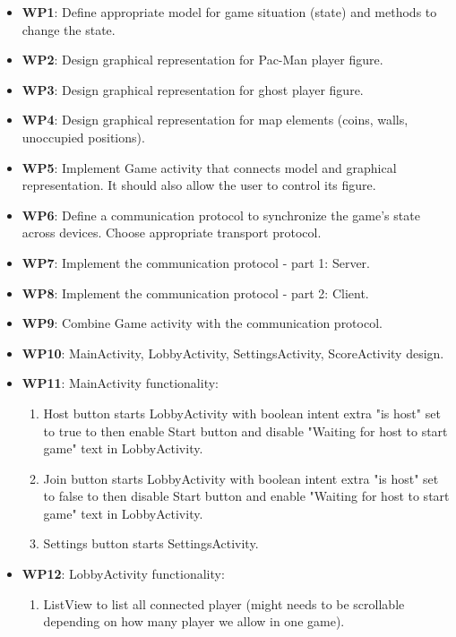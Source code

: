 \documentclass{report}
\begin{document}

\begin{itemize}
	\item {\bf WP1}: Define appropriate model for game situation (state) and methods to change the state.        
	\item {\bf WP2}: Design graphical representation for Pac-Man player figure.
	\item {\bf WP3}: Design graphical representation for ghost player figure.
	\item {\bf WP4}: Design graphical representation for map elements (coins, walls, unoccupied positions).
	\item {\bf WP5}: Implement Game activity that connects model and graphical representation. It should also allow the user to control its figure.
	\item {\bf WP6}: Define a communication protocol to synchronize the game's state across devices. Choose appropriate transport protocol.
	\item {\bf WP7}: Implement the communication protocol - part 1: Server.
	\item {\bf WP8}: Implement the communication protocol - part 2: Client.
	\item {\bf WP9}: Combine Game activity with the communication protocol.
	\item {\bf WP10}: MainActivity, LobbyActivity, SettingsActivity, ScoreActivity design.
	\item {\bf WP11}: MainActivity functionality:
		\begin{enumerate}
			\item Host button starts LobbyActivity with boolean intent extra "is host" set to true to then enable Start button and disable "Waiting for host to start game" text in LobbyActivity.
			\item Join button starts LobbyActivity with boolean intent extra "is host" set to false to then disable Start button and enable "Waiting for host to start game" text in LobbyActivity.
			\item Settings button starts SettingsActivity.
		\end{enumerate}
	\item {\bf WP12}: LobbyActivity functionality:
		\begin{enumerate}
			\item ListView to list all connected player (might needs to be scrollable depending on how many player we allow in one game).

\end{enumerate}
\end{itemize}
\end{document}
